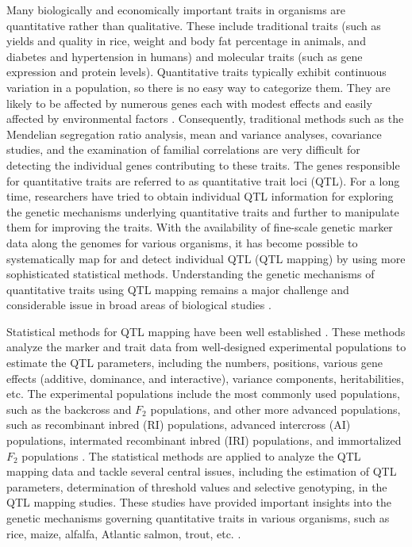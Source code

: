 Many biologically and economically important traits in organisms are quantitative rather than qualitative. These include traditional traits (such as yields and quality in rice, weight and body fat percentage in animals, and diabetes and hypertension in humans) and molecular traits (such as gene expression and protein levels). Quantitative traits typically exhibit continuous variation in a population, so there is no easy way to categorize them. They are likely to be affected by numerous genes each with modest effects and easily affected by environmental factors \citep{Falconer-1996}. Consequently, traditional methods such as the Mendelian segregation ratio analysis, mean and variance analyses, covariance studies, and the examination of familial correlations are very difficult for detecting the individual genes contributing to these traits. The genes responsible for quantitative traits are referred to as quantitative trait loci (QTL). For a long time, researchers have tried to obtain individual QTL information for exploring the genetic mechanisms underlying quantitative traits and further to manipulate them for improving the traits. With the availability of fine-scale genetic marker data along the genomes for various organisms, it has become possible to systematically map for and detect individual QTL (QTL mapping) by using more sophisticated statistical methods. Understanding the genetic mechanisms of quantitative traits using QTL mapping remains a major challenge and considerable issue in broad areas of biological studies \citep{Chen-2020, Kumar-2024, Meng-2024, Mackay-2024}. 

Statistical methods for QTL mapping have been well established \citep{Lander-1989, Haley-1992, Zeng-1993, Jansen-1993, Zeng-1994, Xu-1995, Kao-1999, Kao-2000, Sen-2001, Broman-2003, Kao-2002, Kao-2004, Kao-2006, Verbyla-2007, Li-2008, Kao-2009, Kao-2010, Kao-2012, Lee-2014, Wang-2016}. These methods analyze the marker and trait data from well-designed experimental populations to estimate the QTL parameters,  including the numbers, positions, various gene effects (additive, dominance, and interactive), variance components, heritabilities, etc. The experimental populations include the most commonly used populations, such as the backcross and $F_2$ populations, and other more advanced populations, such as recombinant inbred (RI) populations, advanced intercross (AI) populations, intermated recombinant inbred (IRI) populations, and immortalized $F_2$ populations \citep{Kao-2009}. The statistical methods are applied to analyze the QTL mapping data and tackle several central issues, including the estimation of QTL parameters, determination of threshold values and selective genotyping, in the QTL mapping studies. These studies have provided important insights into the genetic mechanisms governing quantitative traits in various organisms, such as rice, maize, alfalfa, Atlantic salmon, trout, etc. \citep{Vaughan-2007, Chen-2020, Kumar-2024, Meng-2024, Mackay-2024}.

